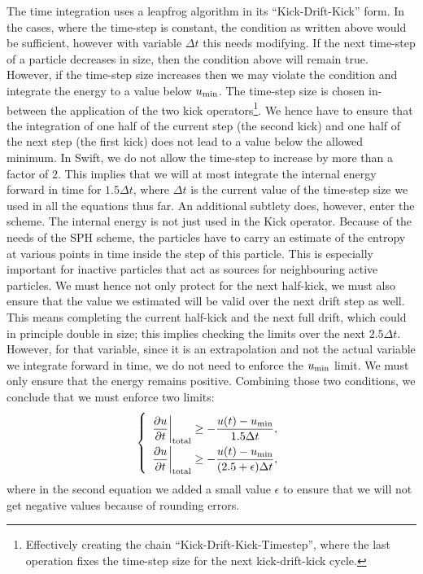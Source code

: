 \documentclass[fleqn, usenatbib, useAMS, a4paper]{mnras}
\newcommand{\swift}{{\sc Swift}\xspace}
\begin{document}
The time integration uses a leapfrog algorithm in its
``Kick-Drift-Kick'' form. In the cases, where the time-step is
constant, the condition as written above would be sufficient, however
with variable $\Delta t$ this needs modifying. If the next time-step
of a particle decreases in size, then the condition above will remain
true. However, if the time-step size increases then we may violate the
condition and integrate the energy to a value below $u_{\rm min}$. The
time-step size is chosen in-between the application of the two kick
operators\footnote{Effectively creating the chain
  ``Kick-Drift-Kick-Timestep'', where the last operation fixes the
  time-step size for the next kick-drift-kick cycle.}. We hence have
to ensure that the integration of one half of the current step (the
second kick) and one half of the next step (the first kick) does not
lead to a value below the allowed minimum. In \swift, we do not allow
the time-step to increase by more than a factor of $2$. This implies
that we will at most integrate the internal energy forward in time for
$1.5\Delta t$, where $\Delta t$ is the current value of the time-step
size we used in all the equations thus far. An additional subtlety
does, however, enter the scheme. The internal energy is not just used
in the Kick operator. Because of the needs of the SPH scheme, the
particles have to carry an estimate of the entropy at various points
in time inside the step of this particle. This is especially important
for inactive particles that act as sources for neighbouring active
particles. We must hence not only protect for the next half-kick, we
must also ensure that the value we estimated will be valid over the
next drift step as well. This means completing the current half-kick
and the next full drift, which could in principle double in size; this
implies checking the limits over the next $2.5\Delta t$. However, for
that variable, since it is an extrapolation and not the actual
variable we integrate forward in time, we do not need to enforce the
$u_{\rm min}$ limit. We must only ensure that the energy remains
positive. Combining those two conditions, we conclude that we must
enforce two limits:
\begin{equation}
  \left\lbrace
  \begin{array}{ll}
  \displaystyle\frac{\partial u}{\partial t}\bigg|_{\rm total}  \geq
  -\displaystyle\frac{u(t) - u_{\rm min} }{1.5 \Delta t}, \Bigg.  \\
  \displaystyle\frac{\partial u}{\partial t}\bigg|_{\rm total}  \geq
  -\displaystyle\frac{u(t) - u_{\rm min} }{(2.5 + \epsilon) \Delta t},  
  \end{array}
  \right.
\end{equation}
where in the second equation we added a small value $\epsilon$ to
ensure that we will not get negative values because of rounding errors.
\end{document}
